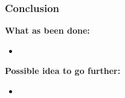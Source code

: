 \documentclass[9pt, notheorems]{beamer}
\theoremstyle{definition}
\theoremstyle{plain}
\theoremstyle{definition}
\begin{document}
\begin{frame}
    \frametitle{Conclusion}
    \textbf{What as been done:}
    \begin{itemize}
        \item
    \end{itemize}
    \textbf{Possible idea to go further:}
    \begin{itemize}
        \item
    \end{itemize}

\end{frame}

\begin{frame}
    
    

\end{frame}
\end{document}
